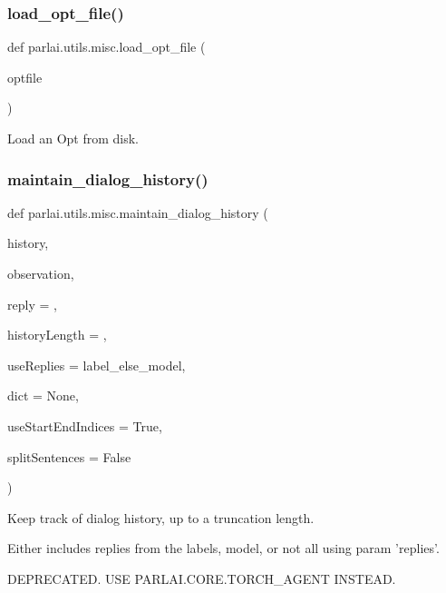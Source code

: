 \subsubsection{\texorpdfstring{load\+\_\+opt\+\_\+file()}{load\_opt\_file()}}
{\footnotesize\ttfamily def parlai.\+utils.\+misc.\+load\+\_\+opt\+\_\+file (\begin{DoxyParamCaption}\item[{}]{optfile }\end{DoxyParamCaption})}

\begin{DoxyVerb}Load an Opt from disk.
\end{DoxyVerb}
 \mbox{\label{namespaceparlai_1_1utils_1_1misc_ac8ca45e62ca906d9b6e5026588a5d2a2}} 
\subsubsection{\texorpdfstring{maintain\+\_\+dialog\+\_\+history()}{maintain\_dialog\_history()}}
{\footnotesize\ttfamily def parlai.\+utils.\+misc.\+maintain\+\_\+dialog\+\_\+history (\begin{DoxyParamCaption}\item[{}]{history,  }\item[{}]{observation,  }\item[{}]{reply = {\ttfamily \textquotesingle{}\textquotesingle{}},  }\item[{}]{history\+Length = {},  }\item[{}]{use\+Replies = {\ttfamily \textquotesingle{}label\+\_\+else\+\_\+model\textquotesingle{}},  }\item[{}]{dict = {\ttfamily None},  }\item[{}]{use\+Start\+End\+Indices = {\ttfamily True},  }\item[{}]{split\+Sentences = {\ttfamily False} }\end{DoxyParamCaption})}

\begin{DoxyVerb}Keep track of dialog history, up to a truncation length.

Either includes replies from the labels, model, or not all using param
'replies'.

DEPRECATED. USE PARLAI.CORE.TORCH_AGENT INSTEAD.
\end{DoxyVerb}
 \mbox{\label{namespaceparlai_1_1utils_1_1misc_ae5db473b41d3b49814e2566e866282b6}} 
